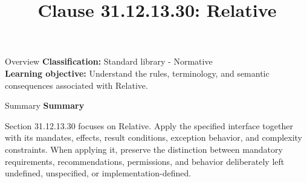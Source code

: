 \documentclass[10pt,letterpaper]{article}
\title{Clause 31.12.13.30: Relative}
\author{}
\date{}
\begin{document}
\maketitle
\begin{CornellOverviewBox}{Overview}
\textbf{Classification:} Standard library - Normative\\[2pt]
\textbf{Learning objective:} Understand the rules, terminology, and semantic consequences associated with Relative.
\end{CornellOverviewBox}\begin{CornellSummaryBox}{Summary}
{\sffamily\bfseries\color{Accent} Summary}\par\vspace{3pt}Section 31.12.13.30 focuses on Relative. Apply the specified interface together with its mandates, effects, result conditions, exception behavior, and complexity constraints. When applying it, preserve the distinction between mandatory requirements, recommendations, permissions, and behavior deliberately left undefined, unspecified, or implementation-defined.
\end{CornellSummaryBox}
\end{document}
